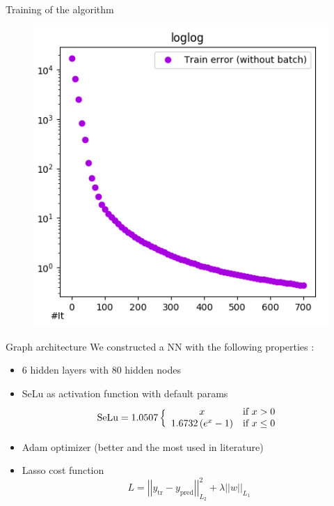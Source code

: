 \documentclass[10pt,
			   xcolor=svgnames,
			   hyperref={linkcolor=red, citecolor = DarkGreen, colorlinks=true, urlcolor=Navy}]{beamer}
\newcommand{\bepar}[1]{
	\left( #1 \right)  
}
\newcommand{\norm}[1]{
	\left \vert \left \vert #1 \right \vert  \right \vert
}
\newcommand{\sarrow}{\item[\color{blue!50!black!70!orange!60} \tiny{\ding{55}}]}
\newcommand\bk{\color{black}}
\newcommand\navy{\color{navy}}
\newcommand\red{\color{red}}
\begin{document}
\begin{frame}{Training of the algorithm}
	\begin{figure}[H]
		\centering
		\includegraphics[scale=0.4]{loglogvbeNN.png}
	\end{figure}
\end{frame}

\begin{frame}{Graph architecture}
We constructed a NN with the following properties :
	\begin{itemize}
	\sarrow \red 6 \bk hidden layers with \red 80 \bk hidden nodes
	\sarrow \red SeLu \bk \citep{klambauer2017self} as activation function with default params\\
	\begin{equation*}
\text{SeLu} = 1. 0507 \,
\Big \{
		\begin{array}{c l}
		x & \text{if } x > 0 \\
		1 . 6732 \bepar{ e^x - 1} & \text{if } x \leq 0
		\end{array}						
\end{equation*}
	\sarrow \navy Adam \bk optimizer \citep{kingma2014adam} (better and the most used in literature)
	\sarrow \navy Lasso \bk cost function $$ L = \norm{ y_{\text{tr}} - y_{\text{pred}}}^2_{L_2} + \lambda \norm{w}_{L_1}$$	
	\end{itemize} 
	
%	
%	
%		

\end{frame}
\end{document}

